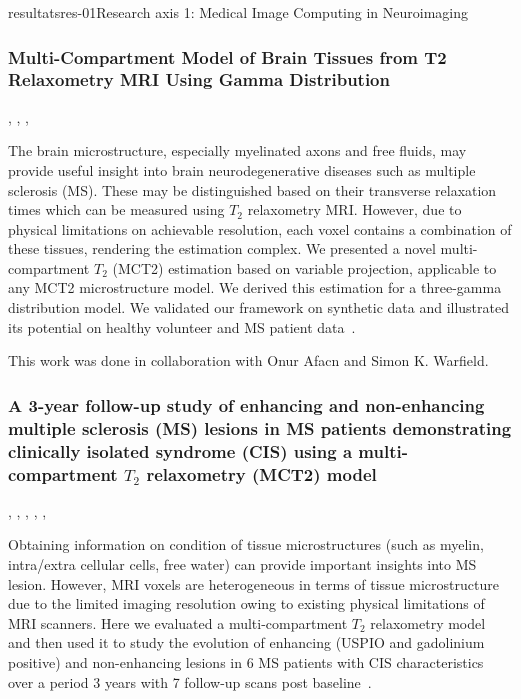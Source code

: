 \documentclass{ra2018}
\begin{document}
\begin{module}{resultats}{res-01}{Research axis 1: Medical Image Computing in Neuroimaging}
\subsubsection{Multi-Compartment Model of Brain Tissues from T2 Relaxometry MRI Using Gamma Distribution}
\begin{participants}
      ,
      , 
      ,
\end{participants}
The brain microstructure, especially myelinated axons and free fluids, may provide useful insight into brain neurodegenerative diseases such as multiple sclerosis (MS). These may be distinguished based on their transverse relaxation times which can be measured using $T_2$ relaxometry MRI. However, due to physical limitations on achievable resolution, each voxel contains a combination of these tissues, rendering the estimation complex. We presented a novel multi-compartment $T_2$ (MCT2) estimation based on variable projection, applicable to any MCT2 microstructure model. We derived this estimation for a three-gamma distribution model. We validated our framework on synthetic data and illustrated its potential on healthy volunteer and MS patient data~\cite{chatterjee:hal-01744852}.

This work was done in collaboration with Onur Afacn and Simon K. Warfield.

\subsubsection{A 3-year follow-up study of enhancing and non-enhancing multiple sclerosis (MS) lesions in MS patients demonstrating clinically isolated syndrome (CIS) using a multi-compartment $T_2$ relaxometry (MCT2) model}
\begin{participants}
      ,
      , 
      ,
      ,
      ,
\end{participants}
Obtaining information on condition of tissue microstructures (such as myelin, intra/extra cellular cells, free water) can provide important insights into MS lesion. However, MRI voxels are heterogeneous in terms of tissue microstructure due to the limited imaging resolution owing to existing physical limitations of MRI scanners. Here we evaluated a multi-compartment $T_2$ relaxometry model and then used it to study the evolution of enhancing (USPIO and gadolinium positive) and non-enhancing lesions in 6 MS patients with CIS characteristics over a period 3 years with 7 follow-up scans post baseline~\cite{chatterjee:hal-01821694}.


\end{module}
\end{document}
